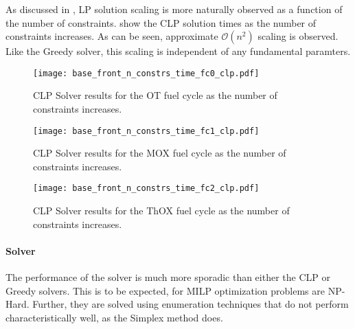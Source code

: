 As discussed in , LP solution scaling is more naturally
observed as a function of the number of
constraints. 
show the CLP solution times as the number of constraints increases. As can be
seen, approximate $\mathcal{O}(n^2)$ scaling is observed. Like the Greedy
solver, this scaling is independent of any fundamental paramters.

\begin{figure}[h!]
  \begin{center}
    \texttt{[image: base\_front\_n\_constrs\_time\_fc0\_clp.pdf]}
    \caption{
      \label{fig:base_front_n_constrs_time_fc0_clp}
      CLP Solver results for the OT fuel cycle as the number of constraints
      increases.
      }
  \end{center}
\end{figure}

\begin{figure}[h!]
  \begin{center}
    \texttt{[image: base\_front\_n\_constrs\_time\_fc1\_clp.pdf]}
    \caption{
      \label{fig:base_front_n_constrs_time_fc1_clp}
      CLP Solver results for the MOX fuel cycle as the number of constraints
      increases.
      }
  \end{center}
\end{figure}

\begin{figure}[h!]
  \begin{center}
    \texttt{[image: base\_front\_n\_constrs\_time\_fc2\_clp.pdf]}
    \caption{
      \label{fig:base_front_n_constrs_time_fc2_clp}
      CLP Solver results for the ThOX fuel cycle as the number of constraints
      increases.
      }
  \end{center}
\end{figure}

\paragraph{\cbc Solver}

The performance of the \cbc solver is much more sporadic than either the CLP or
Greedy solvers. This is to be expected, for MILP optimization problems are
NP-Hard. Further, they are solved using enumeration techniques that do not
perform characteristically well, as the Simplex method does. 

